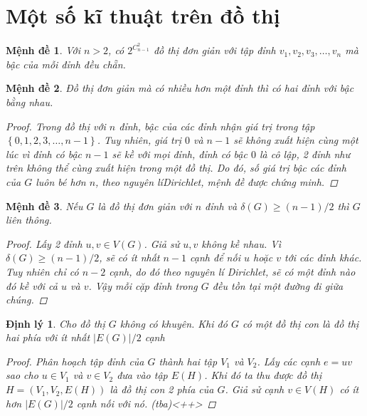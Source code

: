 \documentclass[14pt]{extarticle}
\newtheorem{theorem}{Định lý}[section]
\newtheorem{proposition}{Mệnh đề}[section]
\newcommand{\abs}[1]{\left\lvert#1\right\rvert}
\begin{document}
\section{Một số kĩ thuật trên đồ thị}
\begin{proposition}
	Với $n > 2$, có $2^{C_{n-1}^2}$ đồ thị đơn giản với tập đỉnh $v_1, v_2, v_3, \ldots, v_n$ mà bậc của mỗi đỉnh đều chẵn.
\end{proposition}
\begin{proposition}
	Đồ thị đơn giản mà có nhiều hơn một đỉnh thì có hai đỉnh với bậc bằng nhau.
	\begin{proof}
		Trong đồ thị với $n$ đỉnh, bậc của các đỉnh nhận giá trị trong tập $\left\{0,1,2,3,\ldots,n-1\right\}$. Tuy nhiên, giá trị $0$ và $n-1$ sẽ không xuất hiện cùng một lúc vì đỉnh có bậc $n-1$ sẽ kề với mọi đỉnh, đỉnh có bậc $0$ là cô lập, 2 đỉnh như trên không thể cùng xuất hiện trong một đồ thị. Do đó, số giá trị bậc các đỉnh của $G$ luôn bé hơn $n$, theo nguyên líDirichlet, mệnh đề được chứng minh.
	\end{proof}
\end{proposition}
\begin{proposition}
	Nếu $G$ là đồ thị đơn giản với $n$ đỉnh và $\delta(G) \ge (n-1)/2$ thì $G$ liên thông.
	\begin{proof}
		Lấy 2 đỉnh $u,v \in V(G)$. Giả sử $u,v$ không kề nhau. Vì $\delta(G) \ge (n-1)/2$, sẽ có ít nhất $n-1$ cạnh để nối $u$ hoặc $v$ tới các đỉnh khác. Tuy nhiên chỉ có $n-2$ cạnh, do đó theo nguyên lí Dirichlet, sẽ có một đỉnh nào đó kề với cả $u$ và $v$. Vậy mỗi cặp đỉnh trong $G$ đều tồn tại một đường đi giữa chúng.
	\end{proof}
\end{proposition}
\begin{theorem}
	Cho đồ thị $G$ không có khuyên. Khi đó $G$ có một đồ thị con là đồ thị hai phía với ít nhất $\abs{E(G)}/2$ cạnh
	\begin{proof}
		Phân hoạch tập đỉnh của $G$ thành hai tập $V_1$ và $V_2$. Lấy các cạnh $e=uv$ sao cho $u \in V_1$ và $v\in V_2$ đưa vào tập $E(H)$. Khi đó ta thu được đồ thị $H = (V_1,V_2,E(H))$ là đồ thị con 2 phía của $G$. Giả sử cạnh $v \in V(H)$ có ít hơn $\abs{E(G)}/2$ cạnh nối với nó. (tba)<++>
	\end{proof}
\end{theorem}
\end{document}
